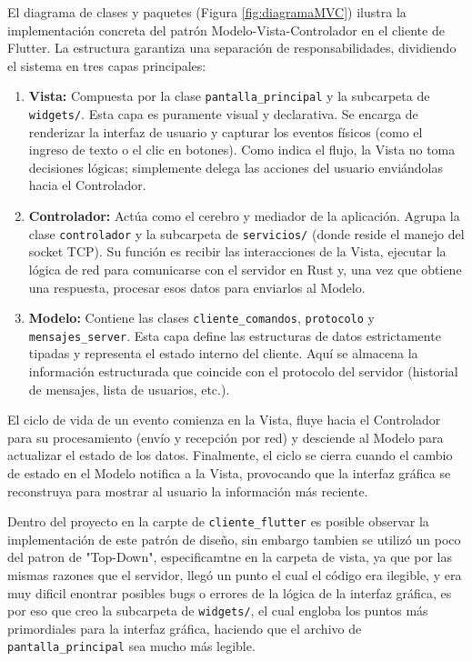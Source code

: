 El diagrama de clases y paquetes (Figura \ref{fig:diagramaMVC}) ilustra la implementación concreta del patrón Modelo-Vista-Controlador en el cliente de Flutter. La estructura garantiza una separación de responsabilidades, dividiendo el sistema en tres capas principales:

\begin{enumerate}
    \item \textbf{Vista:} Compuesta por la clase \texttt{pantalla\_principal} y la subcarpeta de \texttt{widgets/}. Esta capa es puramente visual y declarativa. Se encarga de renderizar la interfaz de usuario y capturar los eventos físicos (como el ingreso de texto o el clic en botones). Como indica el flujo, la Vista no toma decisiones lógicas; simplemente delega las acciones del usuario enviándolas hacia el Controlador.
    
    \item \textbf{Controlador:} Actúa como el cerebro y mediador de la aplicación. Agrupa la clase \texttt{controlador} y la subcarpeta de \texttt{servicios/} (donde reside el manejo del socket TCP). Su función es recibir las interacciones de la Vista, ejecutar la lógica de red para comunicarse con el servidor en Rust y, una vez que obtiene una respuesta, procesar esos datos para enviarlos al Modelo.
    
    \item \textbf{Modelo:} Contiene las clases \texttt{cliente\_comandos}, \texttt{protocolo} y \texttt{mensajes\_server}. Esta capa define las estructuras de datos estrictamente tipadas y representa el estado interno del cliente. Aquí se almacena la información estructurada que coincide con el protocolo del servidor (historial de mensajes, lista de usuarios, etc.).
\end{enumerate}

El ciclo de vida de un evento comienza en la Vista, fluye hacia el Controlador para su procesamiento (envío y recepción por red) y desciende al Modelo para actualizar el estado de los datos. Finalmente, el ciclo se cierra cuando el cambio de estado en el Modelo notifica a la Vista, provocando que la interfaz gráfica se reconstruya para mostrar al usuario la información más reciente.

Dentro del proyecto en la carpte de \texttt{cliente\_flutter} es posible observar la implementación de este patrón de diseño, sin embargo tambien se utilizó un poco del patron de "Top-Down", especificamtne en la carpeta de vista, ya que por las mismas razones que el servidor, llegó un punto el cual el código era ilegible, y era muy dificil enontrar posibles bugs o errores de la lógica de la interfaz gráfica, es por eso que creo la subcarpeta de \texttt{widgets/}, el cual engloba los puntos más primordiales para la interfaz gráfica, haciendo que el archivo de \texttt{pantalla\_principal} sea mucho más legible.

